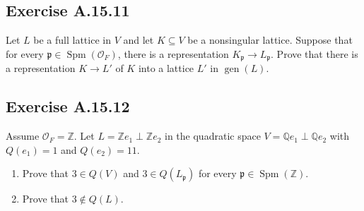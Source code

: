 \documentclass[12pt, a4paper]{article}
\begin{document}
\subsection*{Exercise A.15.11}
Let $L$ be a full lattice in $V$ and let $K \subseteq V$ be a nonsingular lattice. Suppose that for every $\mathfrak{p} \in \operatorname{Spm}(\mathcal{O}_F)$, there is a representation $K_{\mathfrak{p}} \to L_{\mathfrak{p}}$. Prove that there is a representation $K \to L'$ of $K$ into a lattice $L'$ in $\operatorname{gen}(L)$.

\subsection*{Exercise A.15.12}
Assume $\mathcal{O}_F = \mathbb{Z}$. Let $L = \mathbb{Z}e_1 \perp \mathbb{Z}e_2$ in the quadratic space $V = \mathbb{Q}e_1 \perp \mathbb{Q}e_2$ with $Q(e_1) = 1$ and $Q(e_2) = 11$.
\begin{enumerate}
    \item Prove that $3 \in Q(V)$ and $3 \in Q(L_{\mathfrak{p}})$ for every $\mathfrak{p} \in \operatorname{Spm}(\mathbb{Z})$.
    \item Prove that $3 \notin Q(L)$.
\end{enumerate}
\end{document}
